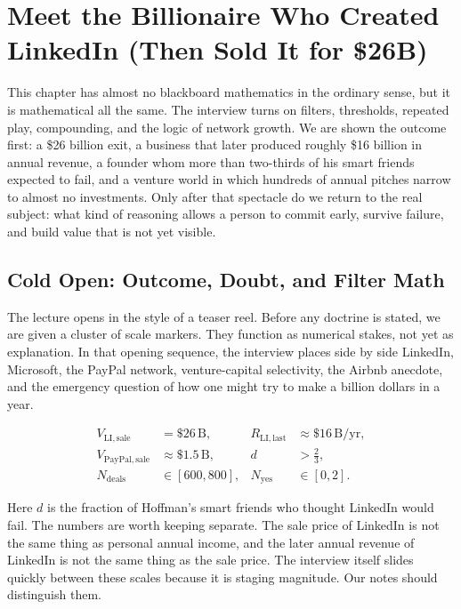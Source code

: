 \chapter{Meet the Billionaire Who Created LinkedIn (Then Sold It for \$26B)}

This chapter has almost no blackboard mathematics in the ordinary sense, but it is mathematical all the same. The interview turns on filters, thresholds, repeated play, compounding, and the logic of network growth. We are shown the outcome first: a \$26 billion exit, a business that later produced roughly \$16 billion in annual revenue, a founder whom more than two-thirds of his smart friends expected to fail, and a venture world in which hundreds of annual pitches narrow to almost no investments. Only after that spectacle do we return to the real subject: what kind of reasoning allows a person to commit early, survive failure, and build value that is not yet visible.

\section{Cold Open: Outcome, Doubt, and Filter Math}

The lecture opens in the style of a teaser reel. Before any doctrine is stated, we are given a cluster of scale markers. They function as numerical stakes, not yet as explanation. In that opening sequence, the interview places side by side LinkedIn, Microsoft, the PayPal network, venture-capital selectivity, the Airbnb anecdote, and the emergency question of how one might try to make a billion dollars in a year.

\begin{align}
V_{\mathrm{LI,sale}} &= \$26\,\mathrm{B}, &
R_{\mathrm{LI,last}} &\approx \$16\,\mathrm{B/yr}, \\
V_{\mathrm{PayPal,sale}} &\approx \$1.5\,\mathrm{B}, &
d &> \frac{2}{3}, \\
N_{\mathrm{deals}} &\in [600,800], &
N_{\mathrm{yes}} &\in [0,2].
\end{align}

Here \(d\) is the fraction of Hoffman's smart friends who thought LinkedIn would fail. The numbers are worth keeping separate. The sale price of LinkedIn is not the same thing as personal annual income, and the later annual revenue of LinkedIn is not the same thing as the sale price. The interview itself slides quickly between these scales because it is staging magnitude. Our notes should distinguish them.

